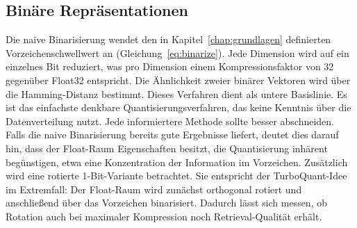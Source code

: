 \subsection{Binäre Repräsentationen}
%
Die naive Binarisierung wendet den in Kapitel~\ref{chap:grundlagen} definierten Vorzeichenschwellwert an (Gleichung~\ref{eq:binarize}).
Jede Dimension wird auf ein einzelnes Bit reduziert, was pro Dimension einem Kompressionsfaktor von 32 gegenüber Float32 entspricht.
Die Ähnlichkeit zweier binärer Vektoren wird über die Hamming-Distanz bestimmt.
%
Dieses Verfahren dient als untere Basislinie.
Es ist das einfachste denkbare Quantisierungsverfahren, das keine Kenntnis über die Datenverteilung nutzt.
Jede informiertere Methode sollte besser abschneiden.
Falls die naive Binarisierung bereits gute Ergebnisse liefert, deutet dies darauf hin, dass der Float-Raum Eigenschaften besitzt, die Quantisierung inhärent begünstigen, etwa eine Konzentration der Information im Vorzeichen.
%
Zusätzlich wird eine rotierte 1-Bit-Variante betrachtet.
Sie entspricht der TurboQuant-Idee im Extremfall: Der Float-Raum wird zunächst orthogonal rotiert und anschließend über das Vorzeichen binarisiert.
Dadurch lässt sich messen, ob Rotation auch bei maximaler Kompression noch Retrieval-Qualität erhält.
%
